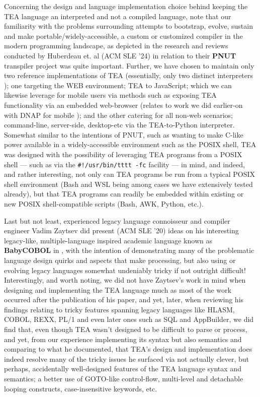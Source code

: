 \documentclass[acmtoplas]{acmart}
\begin{document}
Concerning the design and language implementation choice behind keeping the TEA language an interpreted and not a compiled language, note that our familiarity with the problems surrounding attempts to bootstrap, evolve, sustain and make portable/widely-accessible, a custom or customized compiler in the modern programming landscape, as depicted in the research and reviews conducted by Huberdeau et. al (ACM SLE '24) \cite{huberdeau2024selfcompiling} in relation to their \textbf{PNUT} transpiler project was quite important. Further, we have chosen to maintain only two reference implementations of TEA (essentially, only two distinct interpreters \cite{cli_tttt}); one targeting the WEB environment; TEA to JavaScript; which we can likewise leverage for mobile users via methods such as exposing TEA functionality via an embedded web-browser (relates to work we did earlier-on with DNAP for mobile \cite{lutalodnapintro2020}); and the other catering for all non-web scenarios; command-line, server-side, desktop-etc via the TEA-to-Python interpreter. Somewhat similar to the intentions of PNUT, such as wanting to make C-like power available in a widely-accessible environment such as the POSIX shell, TEA was designed with the possibility of leveraging TEA programs from a POSIX shell --- such as via the \texttt{\#!/usr/bin/tttt -fc} facility --- in mind, and indeed, and rather interesting, not only can TEA programs be run from a typical POSIX shell environment (Bash and WSL being among cases we have extensively tested already), but that TEA programs can readily be embedded within existing or new POSIX shell-compatible scripts (Bash, AWK, Python, etc.).

Last but not least, experienced legacy language connoisseur and compiler engineer Vadim Zaytsev did present (ACM SLE '20) ideas on his interesting legacy-like, multiple-language inspired academic language known as \textbf{BabyCOBOL} in \cite{zaytsev2020worstnightmare}, with the intention of demonstrating many of the problematic language design quirks and aspects that make processing, but also using or evolving legacy languages somewhat undeniably tricky if not outright difficult! Interestingly, and worth noting, we did not have Zaytsev's work in mind when designing and implementing the TEA language much as most of the work occurred after the publication of his paper, and yet, later, when reviewing his findings relating to tricky features spanning legacy languages like HLASM, COBOL, REXX, PL/1 and even later ones such as SQL and AppBuilder, we did find that, even though TEA wasn't designed to be difficult to parse or process, and yet, from our experience implementing its syntax but also semantics and comparing to what he documented, that TEA's design and implementation does indeed resolve many of the tricky issues he surfaced via not actually clever, but perhaps, accidentally well-designed features of the TEA language syntax and semantics; a better use of GOTO-like control-flow, multi-level and detachable looping constructs, case-insensitive keywords, etc. 
\end{document}
